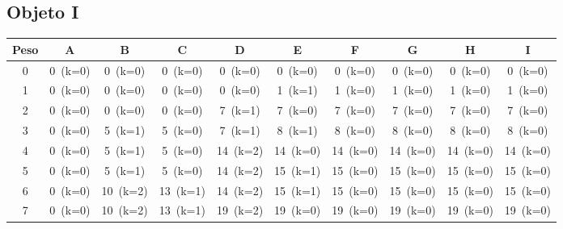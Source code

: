 \documentclass[12pt]{article}
\begin{document}
\begin{landscape}
\subsection*{Objeto I}
\begin{longtable}{cccccccccc}
\toprule
Peso & A & B & C & D & E & F & G & H & I \\
\midrule
0 & \cellcolor{red!20}0~(k=0) & \cellcolor{red!20}0~(k=0) & \cellcolor{red!20}0~(k=0) & \cellcolor{red!20}0~(k=0) & \cellcolor{red!20}0~(k=0) & \cellcolor{red!20}0~(k=0) & \cellcolor{red!20}0~(k=0) & \cellcolor{red!20}0~(k=0) & \cellcolor{red!20}0~(k=0) \\
1 & \cellcolor{red!20}0~(k=0) & \cellcolor{red!20}0~(k=0) & \cellcolor{red!20}0~(k=0) & \cellcolor{red!20}0~(k=0) & \cellcolor{green!40}1~(k=1) & \cellcolor{red!20}1~(k=0) & \cellcolor{red!20}1~(k=0) & \cellcolor{red!20}1~(k=0) & \cellcolor{red!20}1~(k=0) \\
2 & \cellcolor{red!20}0~(k=0) & \cellcolor{red!20}0~(k=0) & \cellcolor{red!20}0~(k=0) & \cellcolor{green!40}7~(k=1) & \cellcolor{red!20}7~(k=0) & \cellcolor{red!20}7~(k=0) & \cellcolor{red!20}7~(k=0) & \cellcolor{red!20}7~(k=0) & \cellcolor{red!20}7~(k=0) \\
3 & \cellcolor{red!20}0~(k=0) & \cellcolor{green!40}5~(k=1) & \cellcolor{red!20}5~(k=0) & \cellcolor{green!40}7~(k=1) & \cellcolor{green!40}8~(k=1) & \cellcolor{red!20}8~(k=0) & \cellcolor{red!20}8~(k=0) & \cellcolor{red!20}8~(k=0) & \cellcolor{red!20}8~(k=0) \\
4 & \cellcolor{red!20}0~(k=0) & \cellcolor{green!40}5~(k=1) & \cellcolor{red!20}5~(k=0) & \cellcolor{green!40}14~(k=2) & \cellcolor{red!20}14~(k=0) & \cellcolor{red!20}14~(k=0) & \cellcolor{red!20}14~(k=0) & \cellcolor{red!20}14~(k=0) & \cellcolor{red!20}14~(k=0) \\
5 & \cellcolor{red!20}0~(k=0) & \cellcolor{green!40}5~(k=1) & \cellcolor{red!20}5~(k=0) & \cellcolor{green!40}14~(k=2) & \cellcolor{green!40}15~(k=1) & \cellcolor{red!20}15~(k=0) & \cellcolor{red!20}15~(k=0) & \cellcolor{red!20}15~(k=0) & \cellcolor{red!20}15~(k=0) \\
6 & \cellcolor{red!20}0~(k=0) & \cellcolor{green!40}10~(k=2) & \cellcolor{green!40}13~(k=1) & \cellcolor{green!40}14~(k=2) & \cellcolor{green!40}15~(k=1) & \cellcolor{red!20}15~(k=0) & \cellcolor{red!20}15~(k=0) & \cellcolor{red!20}15~(k=0) & \cellcolor{red!20}15~(k=0) \\
7 & \cellcolor{red!20}0~(k=0) & \cellcolor{green!40}10~(k=2) & \cellcolor{green!40}13~(k=1) & \cellcolor{green!40}19~(k=2) & \cellcolor{red!20}19~(k=0) & \cellcolor{red!20}19~(k=0) & \cellcolor{red!20}19~(k=0) & \cellcolor{red!20}19~(k=0) & \cellcolor{red!20}19~(k=0) \\

\end{longtable}
\end{landscape}
\end{document}
